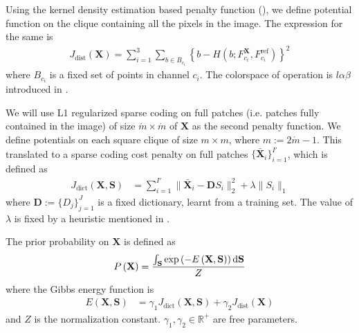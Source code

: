 Using the kernel density estimation based penalty function (), we define potential function on the clique containing all the pixels in the image. The expression for the same is
\begin{align}
J_\text{dist}(\mathbf{X}) = \sum_{i=1}^{3} \sum_{b \in B_{c_i}} \left\lbrace b - H \left( b; F^\mathbf{X}_{c_i}, F^\text{ref}_{c_i} \right) \right\rbrace^2 \label{eqn:cost_kde}
\end{align}
where $B_{c_i}$ is a fixed set of points in channel $c_i$. The colorspace of operation is $l\alpha\beta$ introduced in .

We will use L1 regularized sparse coding on full patches (i.e. patches fully contained in the image) of size $\acute{m} \times \acute{m}$ of $\mathbf{X}$ as the second penalty function. We define potentials on each square clique of size $m \times m$, where $m := 2\acute{m} - 1$. This translated to a sparse coding cost penalty on full patches $\lbrace \mathbf{\bar X}_i \rbrace_{i=1}^{I'}$, which is defined as
\begin{align}
    J_\text{dict} \left( \mathbf{X}, \mathbf{S} \right) &= \sum_{i=1}^{I'} \| \mathbf{\bar X}_i - \mathbf{D} S_i \|_2^2 + \lambda \| S_i \|_1 \label{eqn:dictCost}
\end{align}
where $\mathbf{D} := \lbrace D_j \rbrace_{j=1}^{J}$ is a fixed dictionary, learnt from a training set. The value of $\lambda$ is fixed by a heuristic mentioned in \cite{mairal2009online}.

The prior probability on $\mathbf{X}$ is defined as 
\begin{align}
    P\left( \mathbf{X} \right) = \frac{\int_{\mathbf{S}} \exp \left( -E\left(\mathbf{X}, \mathbf{S} \right) \right) \mathop{}\!\mathrm{d} \mathbf{S}}{Z}
\end{align}
where the Gibbs energy function is
\begin{align}
    E \left(\mathbf{X}, \mathbf{S} \right) &= \gamma_1 J_\text{dict} \left( \mathbf{X}, \mathbf{S} \right) + \gamma_2 J_\text{dist} \left( \mathbf{X} \right)
\end{align}
and $Z$ is the normalization constant. $\gamma_1, \gamma_2 \in \mathbb{R}^+$ are free parameters.

